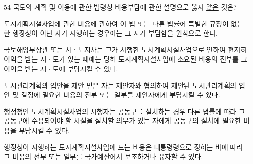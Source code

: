 \begin{question}{54}
국토의 계획 및 이용에 관한 법령상 비용부담에 관한 설명으로 옳지 \uline{않은} 것은?
\begin{choices}
  \item 도시계획시설사업에 관한 비용에 관하여 이 법 또는 다른 법률에 특별한 규정이 없는 한 행정청이 아닌 자가 시행하는 경우에는 그 자가 부담함을 원칙으로 한다.
  \item 국토해양부장관 또는 시ㆍ도지사는 그가 시행한 도시계획시설사업으로 인하여 현저히 이익을 받는 시ㆍ도가 있는 때에는 당해 도시계획시설사업에 소요된 비용의 전부를 그 이익을 받는 시ㆍ도에 부담시킬 수 있다.
  \item 도시관리계획의 입안을 제안 받은 자는 제안자와 협의하여 제안된 도시관리계획의 입안 및 결정에 필요한 비용의 전부 또는 일부를 제안자에게 부담시킬 수 있다.
  \item 행정청인 도시계획시설사업의 시행자는 공동구를 설치하는 경우 다른 법률에 따라 그 공동구에 수용되어야 할 시설을 설치할 의무가 있는 자에게 공동구의 설치에 필요한 비용을 부담시킬 수 있다.
  \item 행정청이 시행하는 도시계획시설사업에 드는 비용은 대통령령으로 정하는 바에 따라 그 비용의 전부 또는 일부를 국가예산에서 보조하거나 융자할 수 있다.
\end{choices}
\end{question}
